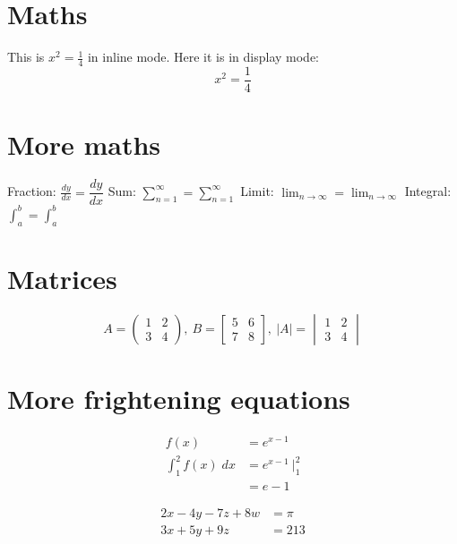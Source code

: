 \documentclass[a4paper,12pt]{article}
\begin{document}
	\section*{Maths}
	
	This is $x^2 =\frac{1}{4}$ in inline mode.
	Here it is in display mode:
	\begin{displaymath}
		x^2 = \frac{1}{4}
	\end{displaymath}
	
	\section*{More maths}
	
	Fraction: $\frac{dy}{dx} = \dfrac{dy}{dx}$ \newline
	Sum: $\sum_{n=1}^{\infty} = \displaystyle\sum_{n=1}^{\infty}$ \newline
	Limit: $\lim_{n \to \infty} = \displaystyle\lim_{n \to \infty}$ \newline
	Integral: $\int_a^b = \displaystyle\int_a^b$
	
	\section*{Matrices}
	
	\begin{displaymath}
		A = \begin{pmatrix} 1 & 2 \\ 3 & 4 \end{pmatrix},~
		B = \begin{bmatrix} 5 & 6 \\ 7 & 8 \end{bmatrix},~
		|A| = \begin{vmatrix} 1 & 2 \\ 3 & 4 \end{vmatrix}
	\end{displaymath}
	
	\section*{More frightening equations}
	
	\begin{align*}
		f(x) &= e^{x-1}\\
		\int_1^2 f(x)\;dx &= e^{x-1} ~\Bigr|_1^2\\
		&= e - 1
	\end{align*}
	
	\begin{align}
		2x - 4y - 7z + 8w &= \pi\\
		3x + 5y + 9z &= 213
	\end{align}
	
\end{document}
